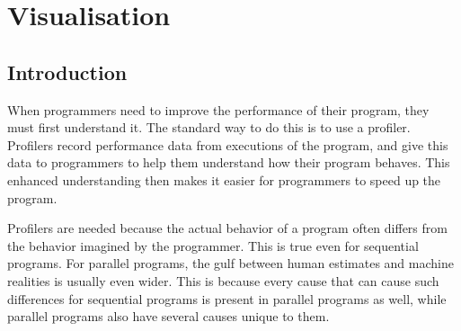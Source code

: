 
\chapter{Visualisation}
\label{chap:tscope}



\section{Introduction}

When programmers need to improve the performance of their program,
they must first understand it.
The standard way to do this is to use a profiler.
Profilers record performance data from executions of the program,
and give this data to programmers
to help them understand how their program behaves.
This enhanced understanding then makes it easier
for programmers to speed up the program.

Profilers are needed because the actual behavior of a program
often differs from the behavior imagined by the programmer.
This is true even for sequential programs.
For parallel programs,
the gulf between human estimates and machine realities
is usually even wider.
This is because every cause
that can cause such differences for sequential programs
is present in parallel programs as well,
while parallel programs also have several causes unique to them.

